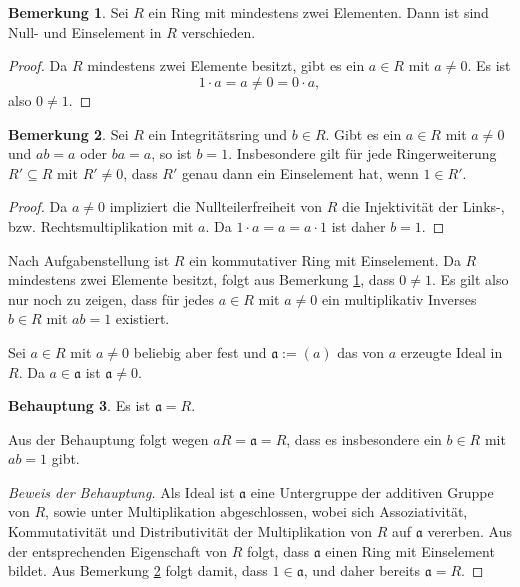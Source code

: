 \documentclass[a4paper,10pt]{article}
\theoremstyle{definition}
\newtheorem{beh}{Behauptung}
\newtheorem{bem}[beh]{Bemerkung}
\newcommand{\mf}[1]{\mathfrak{#1}}
\begin{document}
\section{}

\begin{bem}\label{bem: 0 neq 1}
 Sei $R$ ein Ring mit mindestens zwei Elementen. Dann ist sind Null- und Einselement in $R$ verschieden.
\end{bem}
\begin{proof}
 Da $R$ mindestens zwei Elemente besitzt, gibt es ein $a \in R$ mit $a \neq 0$. Es ist
 \[
  1 \cdot a = a \neq 0 = 0 \cdot a,
 \]
 also $0 \neq 1$.
\end{proof}

\begin{bem}\label{bem: 1 ohne nullteiler eindeutig}
 Sei $R$ ein Integritätsring und $b \in R$. Gibt es ein $a \in R$ mit $a \neq 0$ und $ab = a$ oder $ba = a$, so ist $b = 1$. Insbesondere gilt für jede Ringerweiterung $R' \subseteq R$ mit $R' \neq 0$, dass $R'$ genau dann ein Einselement hat, wenn $1 \in R'$.
 \begin{proof}
  Da $a \neq 0$ impliziert die Nullteilerfreiheit von $R$ die Injektivität der Links-, bzw. Rechtsmultiplikation mit $a$. Da $1 \cdot a = a = a \cdot 1$ ist daher $b = 1$.
 \end{proof}
\end{bem}

Nach Aufgabenstellung ist $R$ ein kommutativer Ring mit Einselement. Da $R$ mindestens zwei Elemente besitzt, folgt aus Bemerkung \ref{bem: 0 neq 1}, dass $0 \neq 1$. Es gilt also nur noch zu zeigen, dass für jedes $a \in R$ mit $a \neq 0$ ein multiplikativ Inverses $b \in R$ mit $ab = 1$ existiert.

Sei $a \in R$ mit $a \neq 0$ beliebig aber fest und $\mf{a} := (a)$ das von $a$ erzeugte Ideal in $R$. Da $a \in \mf{a}$ ist $\mf{a} \neq 0$.

\begin{beh}
 Es ist $\mf{a} = R$.
\end{beh}

Aus der Behauptung folgt wegen $aR = \mf{a} = R$, dass es insbesondere ein $b \in R$ mit $ab = 1$ gibt.

\begin{proof}[Beweis der Behauptung]
 Als Ideal ist $\mf{a}$ eine Untergruppe der additiven Gruppe von $R$, sowie unter Multiplikation abgeschlossen, wobei sich Assoziativität, Kommutativität und Distributivität der Multiplikation von $R$ auf $\mf{a}$ vererben. Aus der entsprechenden Eigenschaft von $R$ folgt, dass $\mf{a}$ einen Ring mit Einselement bildet. Aus Bemerkung \ref{bem: 1 ohne nullteiler eindeutig} folgt damit, dass $1 \in \mf{a}$, und daher bereits $\mf{a} = R$.
\end{proof}
\end{document}
